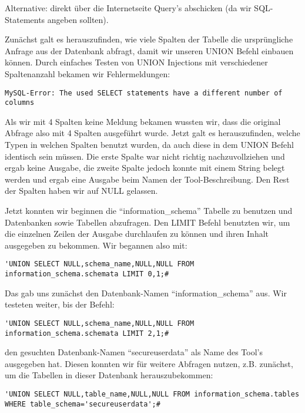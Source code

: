 \documentclass[10pt,a4paper]{article}
\begin{document}
Alternative: direkt über die Internetseite Query's abschicken (da wir SQL-Statements angeben sollten).

Zunächst galt es herauszufinden, wie viele Spalten der Tabelle die ursprüngliche Anfrage aus der Datenbank abfragt, damit wir unseren UNION Befehl einbauen können. Durch einfaches Testen von UNION Injections mit verschiedener Spaltenanzahl bekamen wir Fehlermeldungen:

\begin{verbatim}
MySQL-Error: The used SELECT statements have a different number of columns
\end{verbatim}

Als wir mit 4 Spalten keine Meldung bekamen wussten wir, dass die original Abfrage also mit 4 Spalten ausgeführt wurde. Jetzt galt es herauszufinden, welche Typen in welchen Spalten benutzt wurden, da auch diese in dem UNION Befehl identisch sein müssen. Die erste Spalte war nicht richtig nachzuvollziehen und ergab keine Ausgabe, die zweite Spalte jedoch konnte mit einem String belegt werden und ergab eine Ausgabe beim Namen der Tool-Beschreibung. Den Rest der Spalten haben wir auf NULL gelassen.

Jetzt konnten wir beginnen die "`information\_schema"' Tabelle zu benutzen und Datenbanken sowie Tabellen abzufragen. Den LIMIT Befehl benutzten wir, um die einzelnen Zeilen der Ausgabe durchlaufen zu können und ihren Inhalt ausgegeben zu bekommen. Wir begannen also mit:

\begin{verbatim}
'UNION SELECT NULL,schema_name,NULL,NULL FROM information_schema.schemata LIMIT 0,1;#
\end{verbatim}

Das gab uns zunächst den Datenbank-Namen "`information\_schema"' aus. Wir testeten weiter, bis der Befehl:

\begin{verbatim}
'UNION SELECT NULL,schema_name,NULL,NULL FROM information_schema.schemata LIMIT 2,1;#
\end{verbatim}

den gesuchten Datenbank-Namen "`secureuserdata"' als Name des Tool's ausgegeben hat. Diesen konnten wir für weitere Abfragen nutzen, z.B. zunächst, um die Tabellen in dieser Datenbank herauszubekommen:

\begin{verbatim}
'UNION SELECT NULL,table_name,NULL,NULL FROM information_schema.tables WHERE table_schema='secureuserdata';#
\end{verbatim}
\end{document}

